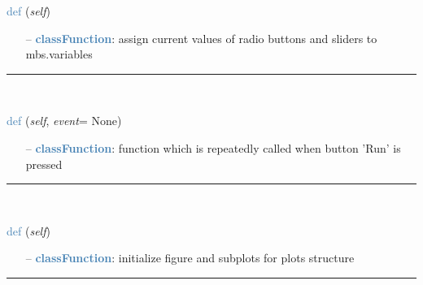 \begin{itemize}[leftmargin=1.4cm]
\begin{itemize}[leftmargin=0.5cm]
\begin{itemize}[leftmargin=1.4cm]
\begin{itemize}[leftmargin=1.4cm]
\begin{itemize}[leftmargin=0.5cm]
\begin{itemize}[leftmargin=1.4cm]
\begin{itemize}[leftmargin=0.5cm]
\begin{itemize}[leftmargin=1.4cm]
\begin{itemize}[leftmargin=1.4cm]
\begin{flushleft}
\noindent \textcolor{steelblue}{def {\bf {}}}\label{sec:interactive:InteractiveDialog:ProcessWidgetStates}
({\it self})
\end{flushleft}
\setlength{\itemindent}{0.7cm}
\begin{itemize}[leftmargin=0.7cm]
  \item[--]  \textcolor{steelblue}{\bf classFunction}: assign current values of radio buttons and sliders to mbs.variables\vspace{12pt}\end{itemize}
%
\noindent\rule{8cm}{0.75pt}\vspace{1pt} \\ 
\begin{flushleft}
\noindent \textcolor{steelblue}{def {\bf {}}}\label{sec:interactive:InteractiveDialog:ContinuousRunFunction}
({\it self}, {\it event}= None)
\end{flushleft}
\setlength{\itemindent}{0.7cm}
\begin{itemize}[leftmargin=0.7cm]
  \item[--]  \textcolor{steelblue}{\bf classFunction}: function which is repeatedly called when button 'Run' is pressed\vspace{12pt}\end{itemize}
%
\noindent\rule{8cm}{0.75pt}\vspace{1pt} \\ 
\begin{flushleft}
\noindent \textcolor{steelblue}{def {\bf {}}}\label{sec:interactive:InteractiveDialog:InitializePlots}
({\it self})
\end{flushleft}
\setlength{\itemindent}{0.7cm}
\begin{itemize}[leftmargin=0.7cm]
  \item[--]  \textcolor{steelblue}{\bf classFunction}: initialize figure and subplots for plots structure\vspace{12pt}\end{itemize}
%
\noindent\rule{8cm}{0.75pt}\vspace{1pt} \\ 
\begin{flushleft}

\end{flushleft}
\end{itemize}
\end{itemize}
\end{itemize}
\end{itemize}
\end{itemize}
\end{itemize}
\end{itemize}
\end{itemize}
\end{itemize}

